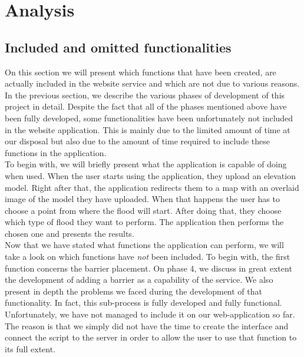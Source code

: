 \chapter{Analysis} %
\label{ch:analysis} %


\section{Included and omitted functionalities}
On this section we will present which functions that have been created, are actually included in the website service and which are not due to various reasons. In the previous section, we describe the various phases of development of this project in detail. Despite the fact that all of the phases mentioned above have been fully developed, some functionalities have been unfortunately not included in the website application. This is mainly due to the limited amount of time at our disposal but also due to the amount of time required to include these functions in the application.\\

To begin with, we will briefly present what the application is capable of doing when used. When the user starts using the application, they upload an elevation model. Right after that, the application redirects them to a map with an overlaid image of the model they have uploaded. When that happens the user has to choose a point from where the flood will start. After doing that, they choose which type of flood they want to perform. The application then performs the chosen one and presents the results.\\

Now that we have stated what functions the application can perform, we will take a look on which functions have \emph{not} been included. To begin with, the first function concerns the barrier placement. On phase 4, we discuss in great extent the development of adding a barrier as a capability of the service. We also present in depth the problems we faced during the development of that functionality. In fact, this sub-process is fully developed and fully functional. Unfortunately, we have not managed to include it on our web-application so far. The reason is that we simply did not have the time to create the interface and connect the script to the server in order to allow the user to use that function to its full extent.\\

